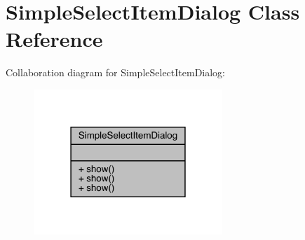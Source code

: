 \hypertarget{classcom_1_1toast_1_1android_1_1gamebase_1_1base_1_1ui_1_1_simple_select_item_dialog}{}\section{Simple\+Select\+Item\+Dialog Class Reference}
\label{classcom_1_1toast_1_1android_1_1gamebase_1_1base_1_1ui_1_1_simple_select_item_dialog}


Collaboration diagram for Simple\+Select\+Item\+Dialog\+:
\nopagebreak
\begin{figure}[H]
\begin{center}
\leavevmode
\includegraphics[width=202pt]{classcom_1_1toast_1_1android_1_1gamebase_1_1base_1_1ui_1_1_simple_select_item_dialog__coll__graph}
\end{center}
\end{figure}
